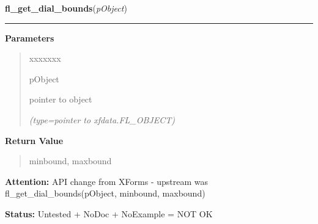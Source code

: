 \hspace{.8\funcindent}\begin{boxedminipage}{\funcwidth}

    \raggedright \textbf{fl\_get\_dial\_bounds}(\textit{pObject})

    \vspace{-1.5ex}

    \rule{\textwidth}{0.5\fboxrule}
\setlength{\parskip}{2ex}
\setlength{\parskip}{1ex}
      \textbf{Parameters}
      \vspace{-1ex}

      \begin{quote}
        \begin{Ventry}{xxxxxxx}

          \item[pObject]

          pointer to object

            {\it (type=pointer to xfdata.FL\_OBJECT)}

        \end{Ventry}

      \end{quote}

      \textbf{Return Value}
    \vspace{-1ex}

      \begin{quote}
      minbound, maxbound

      \end{quote}

\textbf{Attention:} API change from XForms - upstream was fl\_get\_dial\_bounds(pObject, 
minbound, maxbound)



\textbf{Status:} Untested + NoDoc + NoExample = NOT OK



    \end{boxedminipage}

    \label{xformslib:library:fl_set_dial_step}

    \vspace{0.5ex}

